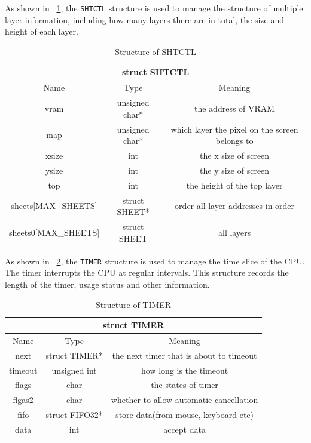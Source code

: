 \documentclass{swfcthesis}
\begin{document}
As shown in ~\ref{tab:SHTCTL}, the \texttt{SHTCTL} structure is used to manage the structure
of multiple layer information, including how many layers there are in total, the size and
height of each layer.
\begin{table}[!htbp]
  \centering
  \begin{tabular}{|c|c|c|}
    \hline
    \multicolumn{3}{|c|}{struct SHTCTL} \\
    \hline
    Name & Type & Meaning \\
    \hline
    vram & unsigned char* & the address of VRAM \\
    \hline
    map & unsigned char* & which layer the pixel on the screen belongs to \\
    \hline
    xsize & int & the x size of screen \\
    \hline
    ysize & int & the y size of screen \\
    \hline
    top & int & the height of the top layer \\
    \hline
    sheets[MAX\_SHEETS] & struct SHEET* & order all layer addresses in order \\
    \hline
    sheets0[MAX\_SHEETS] & struct SHEET & all layers \\
    \hline
  \end{tabular}
  \caption{Structure of SHTCTL}
  \label{tab:SHTCTL}
\end{table}

As shown in ~\ref{tab:TIMER}, the \texttt{TIMER} structure is used to manage the time
slice of the CPU. The timer interrupts the CPU at regular intervals. This structure
records the length of the timer, usage status and other information.
\begin{table}[!htbp]
  \centering
  \begin{tabular}{|c|c|c|}
    \hline
    \multicolumn{3}{|c|}{struct TIMER} \\
    \hline
    Name & Type & Meaning \\
    \hline
    next & struct TIMER* & the next timer that is about to timeout \\
    \hline
    timeout & unsigned int & how long is the timeout \\
    \hline
    flags & char & the states of timer \\
    \hline
    flgas2 & char & whether to allow automatic cancellation \\
    \hline
    fifo & struct FIFO32* & store data(from mouse, keyboard etc) \\
    \hline
    data & int & accept data \\
    \hline
  \end{tabular}
  \caption{Structure of TIMER}
  \label{tab:TIMER}
\end{table}
\end{document}

